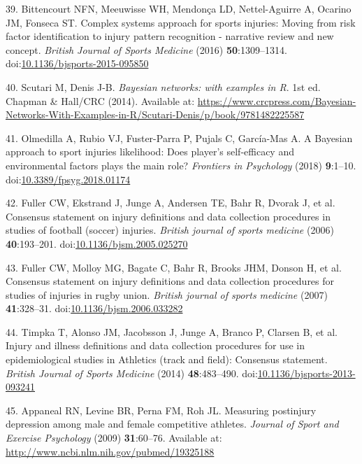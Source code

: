 \documentclass[
  english,
  man]{apa6}
\newenvironment{cslreferences}%
  {}%
  {\par}
\begin{document}
\begin{cslreferences}
\leavevmode\hypertarget{ref-Bittencourt2016}{}%
39. Bittencourt NFN, Meeuwisse WH, Mendonça LD, Nettel-Aguirre A, Ocarino JM, Fonseca ST. Complex systems approach for sports injuries: Moving from risk factor identification to injury pattern recognition - narrative review and new concept. \emph{British Journal of Sports Medicine} (2016) \textbf{50}:1309--1314. doi:\href{https://doi.org/10.1136/bjsports-2015-095850}{10.1136/bjsports-2015-095850}

\leavevmode\hypertarget{ref-Scutari2014}{}%
40. Scutari M, Denis J-B. \emph{Bayesian networks: with examples in R}. 1st ed. Chapman \& Hall/CRC (2014). Available at: \url{https://www.crcpress.com/Bayesian-Networks-With-Examples-in-R/Scutari-Denis/p/book/9781482225587}

\leavevmode\hypertarget{ref-Olmedilla2018}{}%
41. Olmedilla A, Rubio VJ, Fuster-Parra P, Pujals C, García-Mas A. A Bayesian approach to sport injuries likelihood: Does player's self-efficacy and environmental factors plays the main role? \emph{Frontiers in Psychology} (2018) \textbf{9}:1--10. doi:\href{https://doi.org/10.3389/fpsyg.2018.01174}{10.3389/fpsyg.2018.01174}

\leavevmode\hypertarget{ref-Fuller2006}{}%
42. Fuller CW, Ekstrand J, Junge A, Andersen TE, Bahr R, Dvorak J, et al. Consensus statement on injury definitions and data collection procedures in studies of football (soccer) injuries. \emph{British journal of sports medicine} (2006) \textbf{40}:193--201. doi:\href{https://doi.org/10.1136/bjsm.2005.025270}{10.1136/bjsm.2005.025270}

\leavevmode\hypertarget{ref-Fuller2007b}{}%
43. Fuller CW, Molloy MG, Bagate C, Bahr R, Brooks JHM, Donson H, et al. Consensus statement on injury definitions and data collection procedures for studies of injuries in rugby union. \emph{British journal of sports medicine} (2007) \textbf{41}:328--31. doi:\href{https://doi.org/10.1136/bjsm.2006.033282}{10.1136/bjsm.2006.033282}

\leavevmode\hypertarget{ref-Timpka2014}{}%
44. Timpka T, Alonso JM, Jacobsson J, Junge A, Branco P, Clarsen B, et al. Injury and illness definitions and data collection procedures for use in epidemiological studies in Athletics (track and field): Consensus statement. \emph{British Journal of Sports Medicine} (2014) \textbf{48}:483--490. doi:\href{https://doi.org/10.1136/bjsports-2013-093241}{10.1136/bjsports-2013-093241}

\leavevmode\hypertarget{ref-Appaneal2009}{}%
45. Appaneal RN, Levine BR, Perna FM, Roh JL. Measuring postinjury depression among male and female competitive athletes. \emph{Journal of Sport and Exercise Psychology} (2009) \textbf{31}:60--76. Available at: \url{http://www.ncbi.nlm.nih.gov/pubmed/19325188}


\end{cslreferences}
\end{document}
